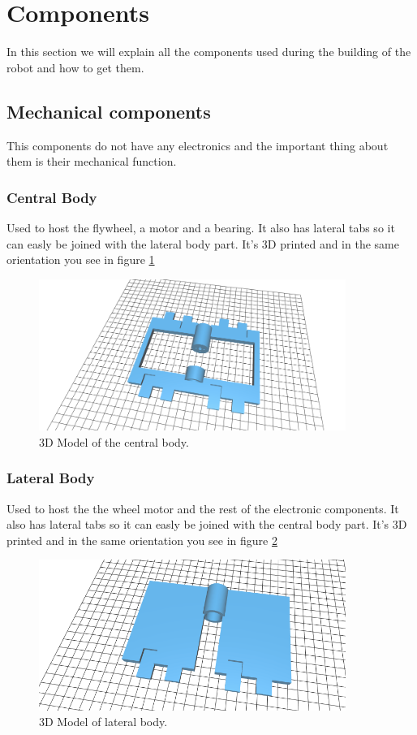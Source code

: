 \section{Components}
In this section we will explain all the components
used during the building of the robot and how to get them.

\subsection{Mechanical components}
This components do not have any electronics and the important
thing about them is their mechanical function.
\subsubsection{Central Body}

Used to host the flywheel, a motor and a bearing. It also has lateral
tabs so it can easly be joined with the lateral body part.
It's 3D printed and in the same orientation you see in figure
\ref{fig: central body}
\begin{figure}[H]
    \centering
    \includegraphics[width=10cm]{img/components/central_body.png}
    \caption{3D Model of the central body.}
    \label{fig: central body}
\end{figure}

\subsubsection{Lateral Body}

Used to host the the wheel motor and the rest of the electronic components. 
It also has lateral tabs so it can easly be joined with the central body part.
It's 3D printed and in the same orientation you see in figure
\ref{fig: lateral body}
\begin{figure}[H]
    \centering
    \includegraphics[width=10cm]{img/components/lateral_body.png}
    \caption{3D Model of lateral body.}
    \label{fig: lateral body}
\end{figure}
